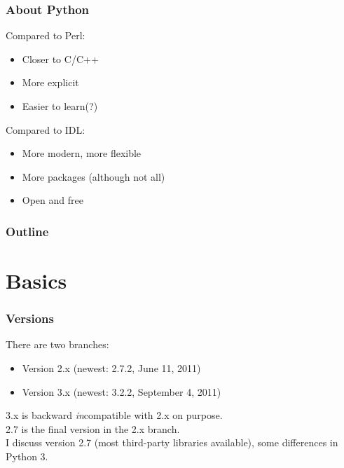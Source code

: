 \documentclass[xetex,10pt]{beamer}
\def\spacer{\vspace*{1em}}
\begin{document}
\begin{frame}
	\frametitle{About Python}
	
	Compared to Perl:
	\begin{itemize}
		\item Closer to C/C++
		\item More explicit
		\item Easier to learn(?)
	\end{itemize}
	
	\spacer
	
	Compared to IDL:
	\begin{itemize}
		\item More modern, more flexible
		\item More packages (although not all)
		\item Open and free
	\end{itemize}
	
\end{frame}

\begin{frame}
    \frametitle{Outline}
    \setcounter{tocdepth}{2}
    \tableofcontents
\end{frame}

\section{Basics}

\begin{frame}
	\frametitle{Versions}
	
	There are two branches:
	
	\begin{itemize}
	\item Version 2.x (newest: 2.7.2, June 11, 2011)
	\item Version 3.x (newest: 3.2.2, September 4, 2011)
	\end{itemize}
	
	3.x is backward \emph{in}compatible with 2.x on purpose.\\
	2.7 is the final version in the 2.x branch.\\[2em]
	
	I discuss version 2.7 (most third-party libraries available), some differences in Python 3.
	
\end{frame}
\end{document}

